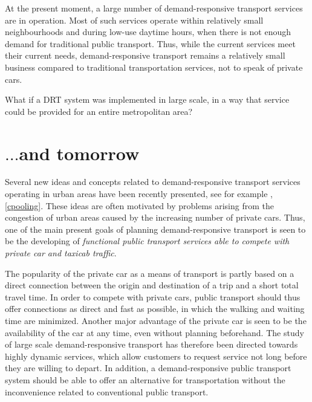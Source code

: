 \documentclass[dissertation,draft*]{aaltoseries}
\begin{document}
At the present moment, a large number of demand-responsive transport services are 
in operation. Most of such services operate within relatively small neighbourhoods and 
during low-use daytime hours, when there is not enough demand for traditional 
public transport. Thus, while the current services meet their current needs,
demand-responsive transport remains a relatively small business
compared to traditional transportation services, not to speak of private cars.

What if a DRT system was implemented in large scale, in a way that service could be provided
for an entire metropolitan area?

\section{$\ldots$and tomorrow}
Several new ideas and concepts related to demand-responsive transport
services operating in urban areas have been recently presented, see for example \cite{cortes,jokinen-fists-2011}, \ref{cpooling}.
These ideas are often motivated by problems arising from the congestion of urban 
areas caused by the increasing number of private cars.
Thus, one of the main present goals of planning demand-responsive transport is seen
to be the developing of \emph{functional public transport services able to compete
with private car and taxicab traffic}.


The popularity of the private car as a means of transport is partly based on
a direct connection between the origin and destination of a trip and
a short total travel time. In order to compete with private cars, public transport 
should thus offer connections as direct and fast as possible, in which 
the walking and waiting time are minimized. 
Another major advantage of the private car is seen to be the availability
of the car at any time, even without planning beforehand. The study of large scale 
demand-responsive transport has therefore been directed towards highly dynamic services, which allow 
customers to request service not long before they are willing to depart.
In addition, a demand-responsive public transport system should be
able to offer an alternative for transportation without
the inconvenience related to conventional public transport.

\end{document}
